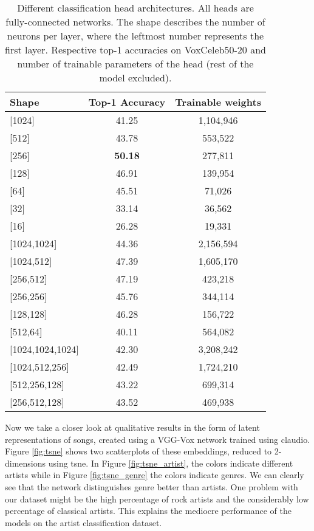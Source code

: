 \begin{table}[p]
  \centering
  \begin{tabular}{l c c}
    \toprule
        Shape & Top-1 Accuracy & Trainable weights \\
        \midrule
        {[1024]} & 41.25 & 1,104,946 \\
        {[512]} & 43.78 & 553,522 \\
        {[256]} & \textbf{50.18} & 277,811 \\
        {[128]} & 46.91 & 139,954 \\
        {[64]} & 45.51 & 71,026 \\
        {[32]} & 33.14 & 36,562 \\
        {[16]} & 26.28 & 19,331 \\
        \midrule
        {[1024,1024]} & 44.36 & 2,156,594 \\
        {[1024,512]} & 47.39 & 1,605,170 \\
        {[256,512]} & 47.19 & 423,218 \\
        {[256,256]} & 45.76 & 344,114 \\
        {[128,128]} & 46.28 & 156,722 \\
        {[512,64]} & 40.11 & 564,082 \\
        \midrule
        {[1024,1024,1024]} & 42.30 & 3,208,242 \\
        {[1024,512,256]} & 42.49 & 1,724,210 \\
        {[512,256,128]} & 43.22 & 699,314 \\
        {[256,512,128]} & 43.52 & 469,938 \\
    \bottomrule
  \end{tabular}
  \caption[Comparison of classification head shapes]{Different classification head architectures. All heads are fully-connected networks. The shape describes the number of neurons per layer, where the leftmost number represents the first layer. Respective top-1 accuracies on VoxCeleb50-20 and number of trainable parameters of the head (rest of the model excluded).}
  \label{tab:classification_heads}
\end{table}

Now we take a closer look at qualitative results in the form of latent representations of songs, created using a VGG-Vox network trained using \gls{claudio}. Figure \ref{fig:tsne} shows two scatterplots of these embeddings, reduced to 2-dimensions using \gls{tsne}. In Figure \ref{fig:tsne_artist}, the colors indicate different artists while in Figure \ref{fig:tsne_genre} the colors indicate genres. We can clearly see that the network distinguishes genre better than artists. One problem with our dataset might be the high percentage of rock artists and the considerably low percentage of classical artists. This explains the mediocre performance of the models on the artist classification dataset.


